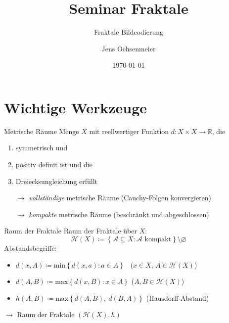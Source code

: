 \documentclass[10pt]{beamer}
\title{Seminar Fraktale}
\subtitle{Fraktale Bildcodierung}
\date{\today}
\author{Jens Ochsenmeier}
\newcommand{\R}{\mathbb{R}}
\renewcommand{\min}{\text{min}}
\renewcommand{\max}{\text{max}}
\begin{document}
\maketitle


\section{Wichtige Werkzeuge}

%
%
\begin{frame}{Metrische Räume}
  Menge \( X \) mit reellwertiger Funktion \( d: X \times X \to \R \), die
  \begin{enumerate}
    \item \alert{symmetrisch} und
    \item \alert{positiv definit} ist und die
    \item \alert{Dreiecksungleichung} erfüllt 
  \end{enumerate}
  \pause{}
  \begin{itemize}
    \item[\( \to \)] \emph{vollständige} metrische Räume (Cauchy-Folgen konvergieren)
    \pause{}
    \item[\( \to \)] \emph{kompakte} metrische Räume (beschränkt und abgeschlossen)
  \end{itemize}
\end{frame}

%
%
\begin{frame}{Raum der Fraktale}
  Raum der Fraktale über \( X \):
  \begin{equation*}
    \mathcal{H}(X) \coloneqq \left \{ \mathcal{A} \subseteq X : \mathcal{A} \text{ kompakt} \right \} \setminus \varnothing
  \end{equation*}
  \pause{}
  \alert{Abstandsbegriffe}:
  \begin{itemize}
    \item \( d(x,A) \coloneqq \min\left \{ d(x,a) : a \in A \right \} \) \quad \ (\( x \in X \), \( A \in \mathcal{H}(X) \))
    \item \( d(A,B) \coloneqq \max\left \{ d(x,B) : x \in A \right \} \) \quad (\( A, B \in \mathcal{H}(X) \))
    \pause{}
    \item \( h(A,B) \coloneqq \max\left \{ d(A,B),\ d(B,A) \right \} \) (Hausdorff-Abstand)
  \end{itemize}
  \pause{}
  \( \to \) \alert{Raum der Fraktale} \( (\mathcal{H}(X), h) \)
\end{frame}
\end{document}
